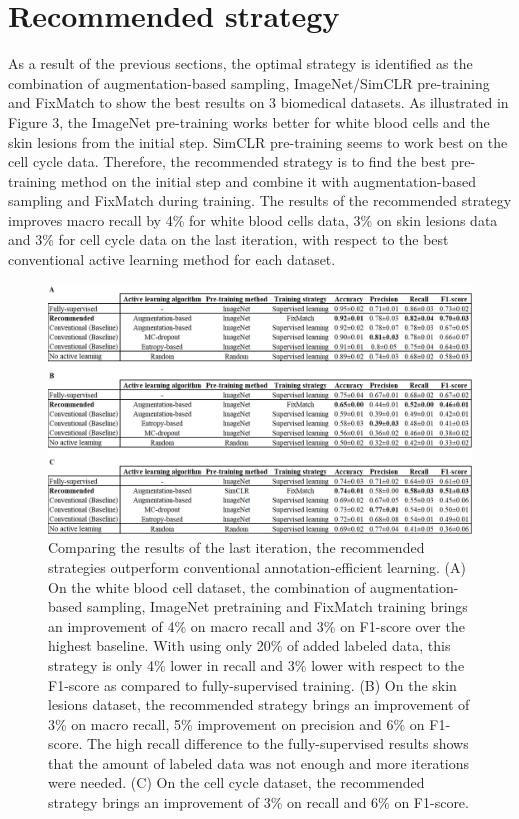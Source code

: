 \section{Recommended strategy}
As a result of the previous sections, the optimal strategy is identified as the combination of augmentation-based sampling, ImageNet/SimCLR pre-training and FixMatch to show the best results on 3 biomedical datasets. As illustrated in Figure 3, the ImageNet pre-training works better for white blood cells and the skin lesions from the initial step. SimCLR pre-training seems to work best on the cell cycle data. Therefore, the recommended strategy is to find the best pre-training method on the initial step and combine it with augmentation-based sampling and FixMatch during training. The results of the recommended strategy improves macro recall by 4\% for white blood cells data, 3\% on skin lesions data and 3\% for cell cycle data on the last iteration, with respect to the best conventional active learning method for each dataset.

\begin{figure}[htbp]
\centering
\captionsetup{format=plain}
\includegraphics[width=\textwidth]{figures/fig_results_3.png}
\caption{Comparing the results of the last iteration, the recommended strategies outperform conventional annotation-efficient learning. (A) On the white blood cell dataset, the combination of augmentation-based sampling, ImageNet pretraining and FixMatch training brings an improvement of 4\% on macro recall and 3\% on F1-score over the highest baseline. With using only 20\% of added labeled data, this strategy is only 4\% lower in recall and 3\% lower with respect to the F1-score as compared to fully-supervised training. (B) On the skin lesions dataset, the recommended strategy brings an improvement of 3\% on macro recall, 5\% improvement on precision and 6\% on F1-score. The high recall difference to the fully-supervised results shows that the amount of labeled data was not enough and more iterations were needed. (C) On the cell cycle dataset, the recommended strategy brings an improvement of 3\% on recall and 6\% on F1-score.
}
\label{fig:results_3}
\end{figure}